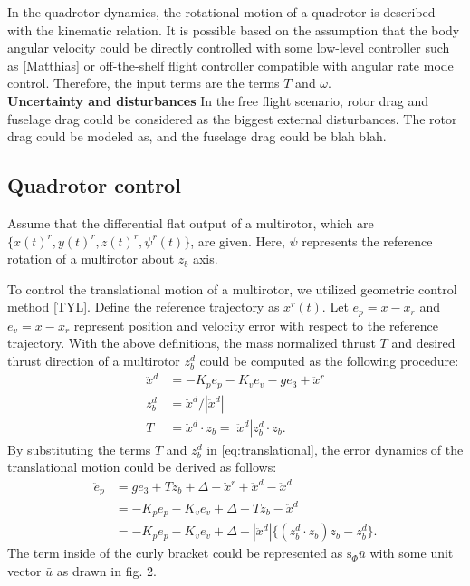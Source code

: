 \documentclass[letterpaper, 10 pt, conference]{ieeeconf}  %
\begin{document}
In the quadrotor dynamics, the rotational motion of a quadrotor is described with the kinematic relation. It is possible based on the assumption that the body angular velocity could be directly controlled with some low-level controller such as [Matthias] or off-the-shelf flight controller compatible with angular rate mode control.
Therefore, the input terms are the terms $T$ and $\omega$.
\\
\textbf{Uncertainty and disturbances}
In the free flight scenario, rotor drag and fuselage drag could be considered as the biggest external disturbances.
The rotor drag could be modeled as, and the fuselage drag could be blah blah.

\subsection{Quadrotor control}
Assume that the differential flat output of a multirotor, which are $\{x(t)^r,y(t)^r,z(t)^r,\psi^r(t)\}$, are given.
Here, $\psi$ represents the reference rotation of a multirotor about $z_b$ axis.

To control the translational motion of a multirotor, we utilized geometric control method [TYL]. 
Define the reference trajectory as $x^r(t)$.
Let $e_p = x - x_r$ and $e_v = \dot{x} - \dot{x}_r$ represent position and velocity error with respect to the reference trajectory.
With the above definitions, the mass normalized thrust $T$  and desired thrust direction of a multirotor $z_b^d$ could be computed as the following procedure:
\begin{align}
\ddot{x}^{d} &= -K_p e_p - K_v e_v -ge_3 + \ddot{x}^r \nonumber \\
z_b^{d} &= \ddot{x}^{d}/|\ddot{x}^{d}| \nonumber \\
T &= \ddot{x}^{d}\cdot z_b = |\ddot{x}^{d}|z_b^d \cdot z_b. \nonumber 
\end{align}
By substituting the terms $T$ and $z_b^d$ in \eqref{eq:translational}, the error dynamics of the translational motion could be derived as follows:
\begin{align}
\ddot{e}_p &= ge_3 + Tz_b + \Delta - \ddot{x}^r + \ddot{x}^d - \ddot{x}^d \nonumber \\
&= -K_pe_p -K_ve_v + \Delta + Tz_b - \ddot{x}^d \nonumber \\
&= -K_pe_p -K_ve_v + \Delta + |\ddot{x}^d|\{(z_b^d\cdot z_b)z_b - z_b^d\}. \nonumber
\end{align}
The term inside of the curly bracket could be represented as $\text{s}_\Phi \bar{u}$ with some unit vector $\bar{u}$ as drawn in fig. 2.
\end{document}
